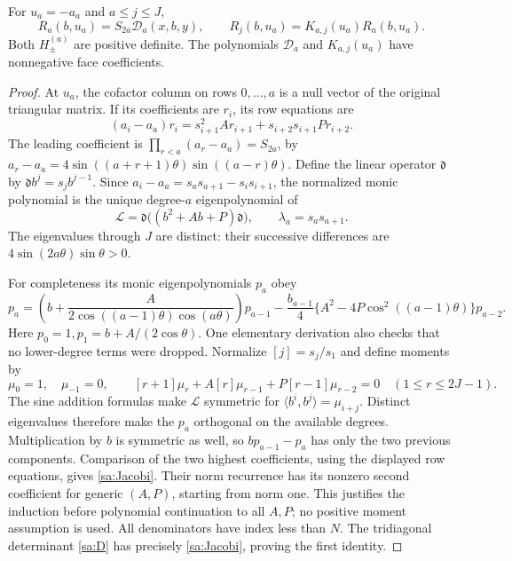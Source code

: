 \begin{lemma}\label{sa:node}
For $u_a=-a_a$ and $a\le j\le J$,
\begin{equation}\label{sa:node-id}
 R_a(b,u_a)=S_{2a}\mathcal D_a(x,b,y),\qquad
 R_j(b,u_a)=K_{a,j}(u_a)R_a(b,u_a).
\end{equation}
Both $H_\pm^{(a)}$ are positive definite. The polynomials
$\mathcal D_a$ and $K_{a,j}(u_a)$ have nonnegative face coefficients.
\end{lemma}
\begin{proof}
At $u_a$, the cofactor column on rows $0,\ldots,a$ is a null vector
of the original triangular matrix. If its coefficients are $r_i$, its
row equations are
\[
 (a_i-a_a)r_i=s_{i+1}^2A r_{i+1}+s_{i+2}s_{i+1}P r_{i+2}.
\]
The leading coefficient is
$\prod_{r<a}(a_r-a_a)=S_{2a}$, by
$a_r-a_a=4\sin((a+r+1)\theta)\sin((a-r)\theta)$.
Define the linear operator $\mathfrak d$ by $\mathfrak d b^j=s_j b^{j-1}$. Since
$a_i-a_a=s_as_{a+1}-s_is_{i+1}$, the normalized monic polynomial
is the unique degree-$a$ eigenpolynomial of
\[
 \mathcal L=\mathfrak d\bigl((b^2+Ab+P)\mathfrak d\bigr),
                     \qquad\lambda_a=s_as_{a+1}.
\]
The eigenvalues through $J$ are distinct: their successive differences
are $4\sin(2a\theta)\sin\theta>0$.

For completeness its monic eigenpolynomials $p_a$ obey
\begin{equation}\label{sa:Jacobi}
 p_a=\left(b+\frac{A}{2\cos((a-1)\theta)\cos(a\theta)}\right)p_{a-1}
       -\frac{b_{a-1}}4\{A^2-4P\cos^2((a-1)\theta)\}p_{a-2}.
\end{equation}
Here $p_0=1,p_1=b+A/(2\cos\theta)$.
One elementary derivation also checks that no lower-degree terms were
dropped. Normalize $[j]=s_j/s_1$ and define moments by
\[
 \mu_0=1,\quad\mu_{-1}=0,\qquad
 [r+1]\mu_r+A[r]\mu_{r-1}+P[r-1]\mu_{r-2}=0
                              \quad(1\le r\le2J-1).
\]
The sine addition formulas make $\mathcal L$ symmetric for
$\langle b^i,b^j\rangle=\mu_{i+j}$. Distinct eigenvalues therefore
make the $p_a$ orthogonal on the available degrees. Multiplication
by $b$ is symmetric as well, so $bp_{a-1}-p_a$ has only the two
previous components. Comparison of the two highest coefficients,
using the displayed row equations, gives \eqref{sa:Jacobi}.
Their norm recurrence has its nonzero second coefficient for generic
$(A,P)$, starting from norm one. This justifies the induction before
polynomial continuation to all $A,P$; no positive moment assumption
is used. All denominators have index less than $N$.
The tridiagonal determinant \eqref{sa:D} has precisely
\eqref{sa:Jacobi}, proving the first identity.


\end{proof}
